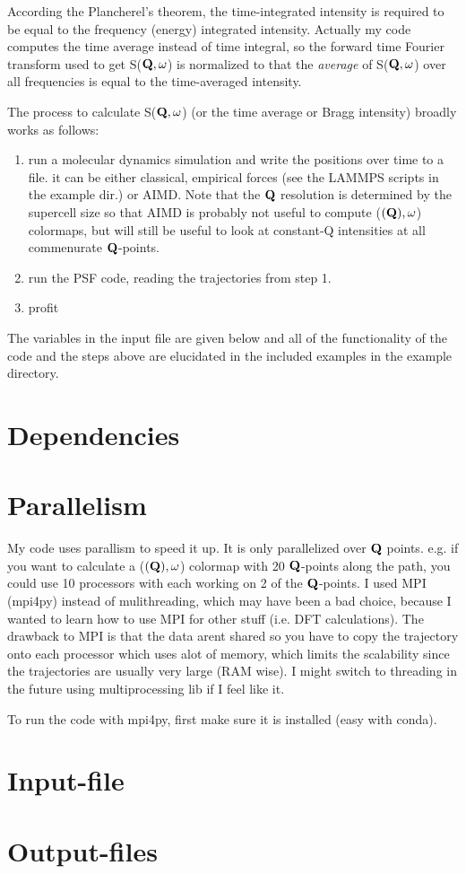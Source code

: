 \documentclass[prl,preprint,aps,superscriptaddress,floatfix]{revtex4-2}
\begin{document}
According the Plancherel's theorem, the time-integrated intensity is required to be equal to the frequency (energy) integrated intensity. Actually my code computes the time average instead of time integral, so the forward time Fourier transform used to get S($\bf{Q},\omega$) is normalized to that the \emph{average} of S($\bf{Q},\omega$) over all frequencies is equal to the time-averaged intensity.

The process to calculate S($\bf{Q},\omega$) (or the time average or Bragg intensity) broadly works as follows: 
\begin{enumerate}
  \item run a molecular dynamics simulation and write the positions over time to a file. it can be either classical, empirical forces (see the LAMMPS scripts in the example dir.) or AIMD. Note that the $\bf{Q}$ resolution is determined by the supercell size so that AIMD is probably not useful to compute ($\bf(Q),\omega$) colormaps, but will still be useful to look at constant-Q intensities at all commenurate $\bf{Q}$-points.
  \item run the \textsc{PSF} code, reading the trajectories from step 1.
  \item profit
\end{enumerate}


The variables in the input file are given below and all of the functionality of the code and the steps above are elucidated in the included examples in the example directory. 

\section{Dependencies}



\section{Parallelism}

My code uses parallism to speed it up. It is only parallelized over $\bf{Q}$ points. e.g. if you want to calculate a ($\bf(Q),\omega$) colormap with 20 $\bf{Q}$-points along the path, you could use 10 processors with each working on 2 of the $\bf{Q}$-points. I used MPI (mpi4py) instead of mulithreading, which may have been a bad choice, because I wanted to learn how to use MPI for other stuff (i.e. DFT calculations). The drawback to MPI is that the data arent shared so you have to copy the trajectory onto each processor which uses alot of memory, which limits the scalability since the trajectories are usually very large (RAM wise). I might switch to threading in the future using multiprocessing lib if I feel like it. 

To run the code with mpi4py, first make sure it is installed (easy with conda). 

\section{Input-file}


\section{Output-files}



\end{document}
